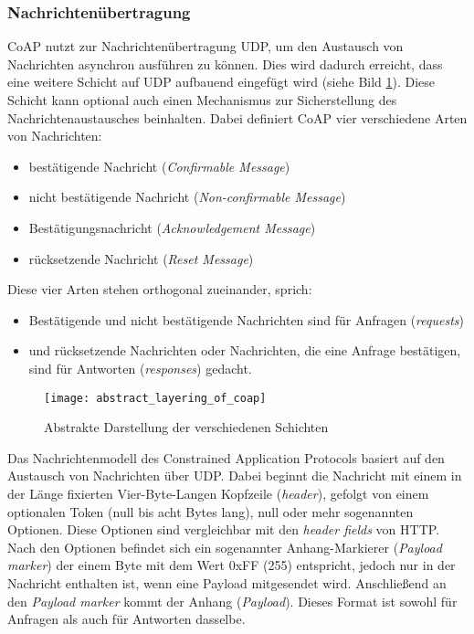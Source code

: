 \subsubsection{Nachrichtenübertragung}
\label{subsubsec:nachrichtenuebertragung}

CoAP nutzt zur Nachrichtenübertragung UDP, um den Austausch von Nachrichten asynchron ausführen zu können. Dies wird dadurch erreicht, dass eine weitere Schicht auf UDP aufbauend eingefügt wird (siehe Bild \ref{fig:abstrakte-darstellung-der-verschiedenen-schichten}). Diese Schicht kann optional auch einen Mechanismus zur Sicherstellung des Nachrichtenaustausches beinhalten. Dabei definiert CoAP vier verschiedene Arten von Nachrichten:
\begin{itemize}
    \item bestätigende Nachricht (\textit{Confirmable Message})
    \item nicht bestätigende Nachricht (\textit{Non-confirmable Message})
    \item Bestätigungsnachricht (\textit{Acknowledgement Message})
    \item rücksetzende Nachricht (\textit{Reset Message})
\end{itemize}

Diese vier Arten stehen orthogonal zueinander, sprich:
\begin{itemize}
    \item Bestätigende und nicht bestätigende Nachrichten sind für Anfragen (\textit{requests})
    \item und rücksetzende Nachrichten oder Nachrichten, die eine Anfrage bestätigen, sind für Antworten (\textit{responses}) gedacht.
\end{itemize}

\begin{figure}[h]
    \centering
    \texttt{[image: abstract\_layering\_of\_coap]}
    \caption{Abstrakte Darstellung der verschiedenen Schichten}
    \label{fig:abstrakte-darstellung-der-verschiedenen-schichten}
\end{figure}

Das Nachrichtenmodell des Constrained Application Protocols basiert auf den Austausch von Nachrichten über UDP. Dabei beginnt die Nachricht mit einem in der Länge fixierten Vier-Byte-Langen Kopfzeile (\textit{header}), gefolgt von einem optionalen Token (null bis acht Bytes lang), null oder mehr sogenannten Optionen. Diese Optionen sind vergleichbar mit den \textit{header fields} von HTTP. Nach den Optionen befindet sich ein sogenannter Anhang-Markierer (\textit{Payload marker}) der einem Byte mit dem Wert 0xFF (255) entspricht, jedoch nur in der Nachricht enthalten ist, wenn eine Payload mitgesendet wird. Anschließend an den \textit{Payload marker} kommt der Anhang (\textit{Payload}). Dieses Format ist sowohl für Anfragen als auch für Antworten dasselbe.


